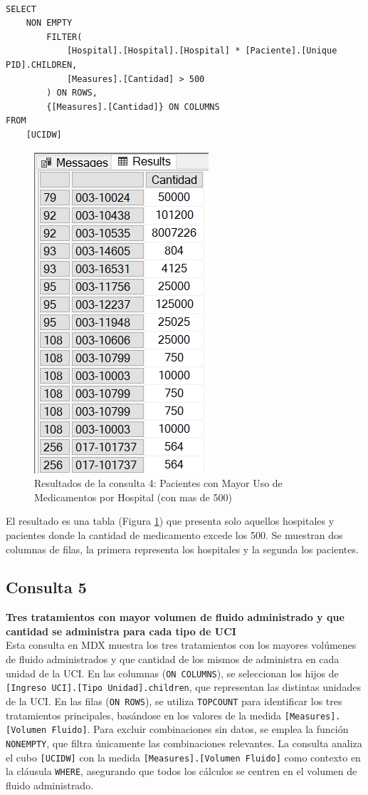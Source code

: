 \documentclass{article}
\begin{document}
\begin{lstlisting}[style=ddlstyle, label=lst:consulta4,caption=Consulta 4: Pacientes con Mayor Uso de Medicamentos por Hospital (con mas de 500)]
	
SELECT 
	NON EMPTY 
		FILTER(
			[Hospital].[Hospital].[Hospital] * [Paciente].[Unique PID].CHILDREN,
			[Measures].[Cantidad] > 500
		) ON ROWS, 
		{[Measures].[Cantidad]} ON COLUMNS
FROM 
	[UCIDW]
\end{lstlisting}

\begin{figure}[H]
	\centering
	\includegraphics[width=0.3\linewidth]{images/consulta4.png}
	\caption{Resultados de la consulta 4: Pacientes con Mayor Uso de Medicamentos por Hospital (con mas de 500)}
	\label{fig:consulta4}
\end{figure}

El resultado es una tabla (Figura \ref{fig:consulta4}) que presenta solo aquellos hospitales y pacientes donde la cantidad de medicamento excede los 500. Se muestran dos columnas de filas, la primera representa los hospitales y la segunda los pacientes.

\subsection{Consulta 5}

\textbf{Tres tratamientos con mayor volumen de fluido administrado y que cantidad se administra para cada tipo de UCI}
\\

Esta consulta en MDX muestra los tres tratamientos con los mayores volúmenes de fluido administrados y que cantidad de los mismos de administra en cada unidad de la UCI. En las columnas (\texttt{ON COLUMNS}), se seleccionan los hijos de \texttt{[Ingreso UCI].[Tipo Unidad].children}, que representan las distintas unidades de la UCI. En las filas (\texttt{ON ROWS}), se utiliza \texttt{TOPCOUNT} para identificar los tres tratamientos principales, basándose en los valores de la medida \texttt{[Measures].[Volumen Fluido]}. Para excluir combinaciones sin datos, se emplea la función \texttt{NONEMPTY}, que filtra únicamente las combinaciones relevantes. La consulta analiza el cubo \texttt{[UCIDW]} con la medida \texttt{[Measures].[Volumen Fluido]} como contexto en la cláusula \texttt{WHERE}, asegurando que todos los cálculos se centren en el volumen de fluido administrado.
\\ 
\end{document}
